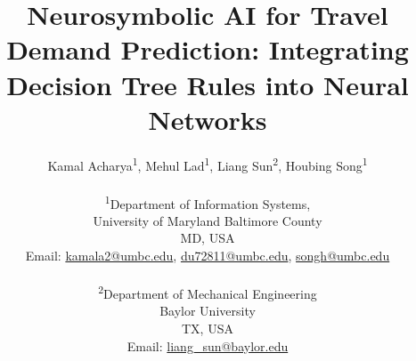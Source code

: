 \documentclass[12pt, letterpaper]{article}
\begin{document}
\title{\textbf{Neurosymbolic AI for Travel Demand Prediction: Integrating Decision Tree Rules into Neural Networks}}

\author{
    Kamal Acharya\textsuperscript{1}, Mehul Lad\textsuperscript{1}, Liang Sun\textsuperscript{2}, Houbing Song\textsuperscript{1} \\ \\
    \textsuperscript{1}Department of Information Systems, \\ University of Maryland Baltimore County\\ MD, USA \\ 
    Email: \url{kamala2@umbc.edu}, \url{du72811@umbc.edu}, \url{songh@umbc.edu} \\ \\
    \textsuperscript{2}Department of Mechanical Engineering\\ Baylor University\\ TX, USA \\
    Email: \url{liang_sun@baylor.edu}
}

\date{} %

\maketitle

\onehalfspacing %
\end{document}
